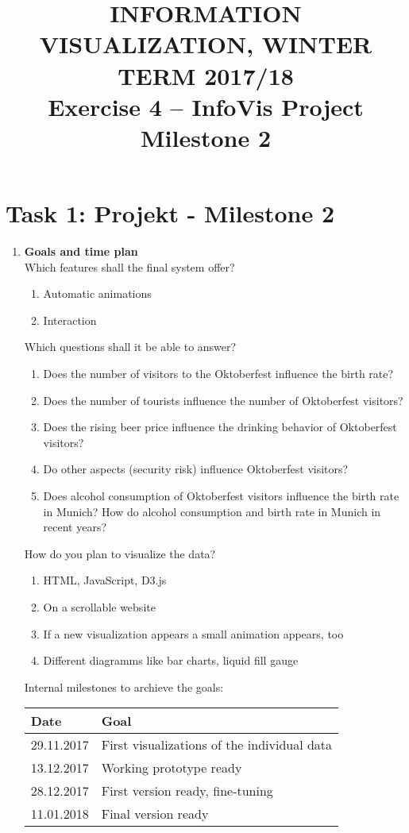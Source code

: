 \documentclass[11pt, twoside, BCOR=8mm, DIV=12]{scrartcl}
\title{{\Large INFORMATION VISUALIZATION, WINTER TERM 2017/18} \\ Exercise 4 – InfoVis Project Milestone 2}
\begin{document}
\maketitle
\section*{Task 1: Projekt - Milestone 2}
\begin{enumerate}[label=\alph*)]
\item \textbf{Goals and time plan}\\
Which features shall the final system offer?
\begin{enumerate}[label=\arabic*)]
\item Automatic animations
\item Interaction
\end{enumerate}
Which questions shall it be able to answer?
\begin{enumerate}[label=\arabic*)]
\item Does the number of visitors to the Oktoberfest influence the birth rate?
\item Does the number of tourists influence the number of Oktoberfest visitors?
\item Does the rising beer price influence the drinking behavior of Oktoberfest visitors?
\item Do other aspects (security risk) influence Oktoberfest visitors?
\item Does alcohol consumption of  Oktoberfest visitors influence the birth rate in Munich? How do alcohol consumption and birth rate in Munich in recent years?
\end{enumerate}
How do you plan to visualize the data?
\begin{enumerate}[label=\arabic*)]
\item HTML, JavaScript, D3.js
\item On a scrollable website
\item If a new visualization appears a small animation appears, too
\item Different diagramms like bar charts, liquid fill gauge
\end{enumerate}
Internal milestones to archieve the goals:
\begin{table}[H]
\begin{tabular}{l l}
Date & Goal \\
\hline
29.11.2017 & First visualizations of the individual data\\
\hline
13.12.2017 & Working prototype ready \\
\hline
28.12.2017 & First version ready, fine-tuning \\
\hline
11.01.2018 & Final version ready \\
\end{tabular}
\end{table}


\end{enumerate}
\end{document}
